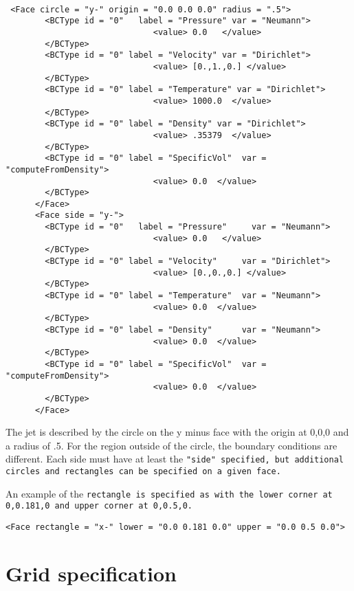 \begin{Verbatim}[fontsize=\footnotesize]

 <Face circle = "y-" origin = "0.0 0.0 0.0" radius = ".5">
        <BCType id = "0"   label = "Pressure" var = "Neumann">
                              <value> 0.0   </value>
        </BCType>
        <BCType id = "0" label = "Velocity" var = "Dirichlet">
                              <value> [0.,1.,0.] </value>
        </BCType>
        <BCType id = "0" label = "Temperature" var = "Dirichlet">
                              <value> 1000.0  </value>
        </BCType>
        <BCType id = "0" label = "Density" var = "Dirichlet">
                              <value> .35379  </value>
        </BCType>
        <BCType id = "0" label = "SpecificVol"  var = "computeFromDensity">
                              <value> 0.0  </value>
        </BCType>
      </Face>
      <Face side = "y-">
        <BCType id = "0"   label = "Pressure"     var = "Neumann">
                              <value> 0.0   </value>
        </BCType>
        <BCType id = "0" label = "Velocity"     var = "Dirichlet">
                              <value> [0.,0.,0.] </value>
        </BCType>
        <BCType id = "0" label = "Temperature"  var = "Neumann">
                              <value> 0.0  </value>
        </BCType>
        <BCType id = "0" label = "Density"      var = "Neumann">
                              <value> 0.0  </value>
        </BCType>
        <BCType id = "0" label = "SpecificVol"  var = "computeFromDensity">
                              <value> 0.0  </value>
        </BCType>
      </Face>

\end{Verbatim}

The jet is described by the circle on the y minus face with the origin
at 0,0,0 and a radius of .5.  For the region outside of the circle,
the boundary conditions are different.  Each side must have at least
the \tt "side" \normalfont specified, but additional circles and
rectangles can be specified on a given face.

An example of the \tt rectangle \normalfont is specified as with the
lower corner at 0,0.181,0 and upper corner at 0,0.5,0.


\begin{Verbatim}[fontsize=\footnotesize]
 <Face rectangle = "x-" lower = "0.0 0.181 0.0" upper = "0.0 0.5 0.0">
\end{Verbatim}

%
\section{Grid specification} \label{Sec:Grid}

